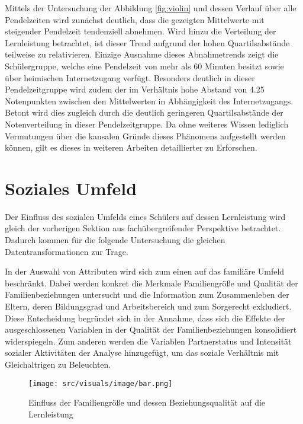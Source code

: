 Mittels der Untersuchung der Abbildung \ref{fig:violin} und dessen Verlauf über alle Pendelzeiten wird zunächst deutlich, dass die gezeigten Mittelwerte mit steigender Pendelzeit tendenziell abnehmen. 
Wird hinzu die Verteilung der Lernleistung betrachtet, ist dieser Trend aufgrund der hohen Quartilsabstände teilweise zu relativieren.
Einzige Ausnahme dieses Abnahmetrends zeigt die Schülergruppe, welche eine Pendelzeit von mehr als 60 Minuten besitzt sowie über heimischen Internetzugang verfügt.
Besonders deutlich in dieser Pendelzeitgruppe wird zudem der im Verhältnis hohe Abstand von 4.25 Notenpunkten zwischen den Mittelwerten in Abhängigkeit des Internetzugangs.
Betont wird dies zugleich durch die deutlich geringeren Quartilsabstände der Notenverteilung in dieser Pendelzeitgruppe.
Da ohne weiteres Wissen lediglich Vermutungen über die kausalen Gründe dieses Phänomens aufgestellt werden können, gilt es dieses in weiteren Arbeiten detaillierter zu Erforschen.


\section{Soziales Umfeld}

Der Einfluss des sozialen Umfelds eines Schülers auf dessen Lernleistung wird gleich der vorherigen Sektion aus fachübergreifender Perspektive betrachtet.
Dadurch kommen für die folgende Untersuchung die gleichen Datentransformationen zur Trage.

In der Auswahl von Attributen wird sich zum einen auf das familiäre Umfeld beschränkt. 
Dabei werden konkret die Merkmale Familiengröße und Qualität der Familienbeziehungen untersucht und die Information zum Zusammenleben der Eltern, deren Bildungsgrad und Arbeitsbereich und zum Sorgerecht exkludiert.
Diese Entscheidung begründet sich in der Annahme, dass sich die Effekte der ausgeschlossenen Variablen in der Qualität der Familienbeziehungen konsolidiert widerspiegeln.
Zum anderen werden die Variablen Partnerstatus und Intensität sozialer Aktivitäten der Analyse hinzugefügt, um das soziale Verhältnis mit Gleichaltrigen zu Beleuchten.

\begin{figure}[htb]
    \centering
    \texttt{[image: src/visuals/image/bar.png]}
    \caption{Einfluss der Familiengröße und dessen Beziehungsqualität auf die Lernleistung}
    \label{fig:bar}
\end{figure}

